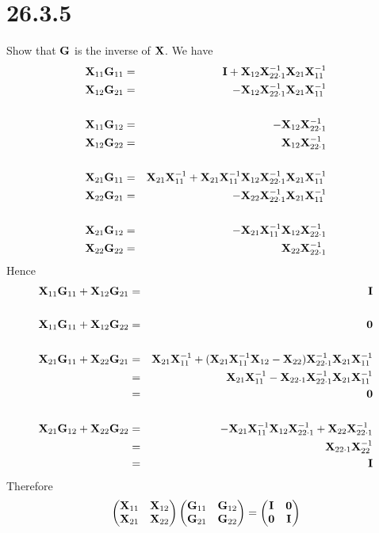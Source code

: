 \section*{26.3.5}
Show that $\bf G$ is the inverse of $\bf X$.
We have
\begin{eqnarray*}
{\bf X}_{11}{\bf G}_{11}&=&{\bf I}+{\bf X}_{12}{\bf X}_{22\cdot1}^{-1}{\bf X}_{21}{\bf X}_{11}^{-1}\\
{\bf X}_{12}{\bf G}_{21}&=&-{\bf X}_{12}{\bf X}_{22\cdot1}^{-1}{\bf X}_{21}{\bf X}_{11}^{-1}\\
\\
{\bf X}_{11}{\bf G}_{12}&=&-{\bf X}_{12}{\bf X}_{22\cdot1}^{-1}\\
{\bf X}_{12}{\bf G}_{22}&=&{\bf X}_{12}{\bf X}_{22\cdot1}^{-1}\\
\\
{\bf X}_{21}{\bf G}_{11}&=&{\bf X}_{21}{\bf X}_{11}^{-1}+
{\bf X}_{21}{\bf X}_{11}^{-1}{\bf X}_{12}{\bf X}_{22\cdot1}^{-1}{\bf X}_{21}{\bf X}_{11}^{-1}\\
{\bf X}_{22}{\bf G}_{21}&=&-{\bf X}_{22}{\bf X}_{22\cdot1}^{-1}{\bf X}_{21}{\bf X}_{11}^{-1}\\
\\
{\bf X}_{21}{\bf G}_{12}&=&-{\bf X}_{21}{\bf X}_{11}^{-1}{\bf X}_{12}{\bf X}_{22\cdot1}^{-1}\\
{\bf X}_{22}{\bf G}_{22}&=&{\bf X}_{22}{\bf X}_{22\cdot1}^{-1}
\end{eqnarray*}
Hence
\begin{eqnarray*}
{\bf X}_{11}{\bf G}_{11}+{\bf X}_{12}{\bf G}_{21}&=&{\bf I}\\
\\
{\bf X}_{11}{\bf G}_{11}+{\bf X}_{12}{\bf G}_{22}&=&{\bf 0}\\
\\
{\bf X}_{21}{\bf G}_{11}+{\bf X}_{22}{\bf G}_{21}&=&{\bf X}_{21}{\bf X}_{11}^{-1}+
({\bf X}_{21}{\bf X}_{11}^{-1}{\bf X}_{12}-{\bf X}_{22}){\bf X}_{22\cdot1}^{-1}{\bf X}_{21}{\bf X}_{11}^{-1}\\
&=&{\bf X}_{21}{\bf X}_{11}^{-1}-{\bf X}_{22\cdot1}{\bf X}_{22\cdot1}^{-1}{\bf X}_{21}{\bf X}_{11}^{-1}\\
&=&{\bf 0}\\
\\
{\bf X}_{21}{\bf G}_{12}+{\bf X}_{22}{\bf G}_{22}&=&-{\bf X}_{21}{\bf X}_{11}^{-1}{\bf X}_{12}{\bf X}_{22\cdot1}^{-1}
+{\bf X}_{22}{\bf X}_{22\cdot1}^{-1}\\
&=&{\bf X}_{22\cdot1}{\bf X}_{22}^{-1}\\
&=&{\bf I}
\end{eqnarray*}
Therefore
$$\left(\begin{matrix}
{\bf X}_{11} & {\bf X}_{12}\cr
{\bf X}_{21} & {\bf X}_{22}
\end{matrix}\right)\left(\begin{matrix}
{\bf G}_{11} & {\bf G}_{12}\cr
{\bf G}_{21} & {\bf G}_{22}
\end{matrix}\right)=\left(\begin{matrix}
{\bf I} & {\bf 0}\cr
{\bf 0} & {\bf I}
\end{matrix}\right)
$$
